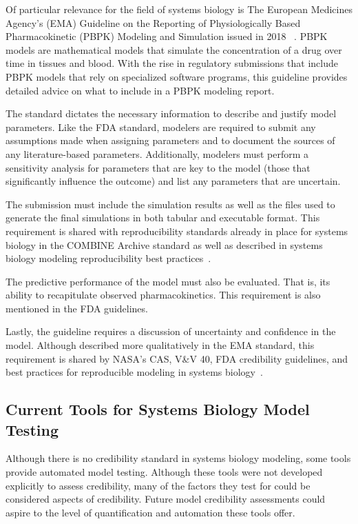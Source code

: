 \documentclass[12pt]{report}
\begin{document}
Of particular relevance for the field of systems biology is The European Medicines Agency's (EMA) Guideline on the Reporting of Physiologically Based Pharmacokinetic (PBPK) Modeling and Simulation issued in 2018~\cite{viceconti2021, Shepard2015} . PBPK models are mathematical models that simulate the concentration of a drug over time in tissues and blood. With the rise in regulatory submissions that include PBPK models that rely on specialized software programs, this guideline provides detailed advice on what to include in a PBPK modeling report. 

The standard dictates the necessary information to describe and justify model parameters. Like the FDA standard, modelers are required to submit any assumptions made when assigning parameters and to document the sources of any literature-based parameters. Additionally, modelers must perform a sensitivity analysis for parameters that are key to the model (those that significantly influence the outcome) and list any parameters that are uncertain. 

The submission must include the simulation results as well as the files used to generate the final simulations in both tabular and executable format. This requirement is shared with reproducibility standards already in place for systems biology in the COMBINE Archive standard as well as described in systems biology modeling reproducibility best practices~\cite{porubsky_best_2020}.

The predictive performance of the model must also be evaluated. That is, its ability to recapitulate observed pharmacokinetics. This requirement is also mentioned in the FDA guidelines. 

Lastly, the guideline requires a discussion of uncertainty and confidence in the model. Although described more qualitatively in the EMA standard, this requirement is shared by NASA's CAS, V\&V 40, FDA credibility guidelines, and best practices for reproducible modeling in systems biology~\cite{porubsky_best_2020}.




\subsection{Current Tools for Systems Biology Model Testing}
Although there is no credibility standard in systems biology modeling, some tools provide automated model testing. Although these tools were not developed explicitly to assess credibility, many of the factors they test for could be considered aspects of credibility. Future model credibility assessments could aspire to the level of quantification and automation these tools offer. 
 
\end{document}
